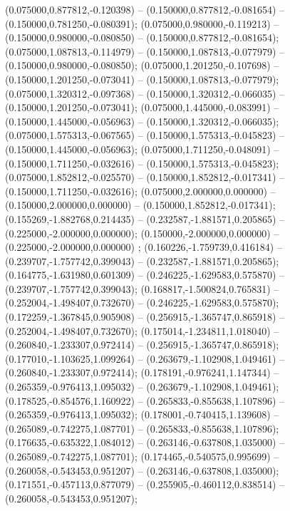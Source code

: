  (0.075000,0.877812,-0.120398) -- (0.150000,0.877812,-0.081654) -- (0.150000,0.781250,-0.080391);
 (0.075000,0.980000,-0.119213) -- (0.150000,0.980000,-0.080850) -- (0.150000,0.877812,-0.081654);
 (0.075000,1.087813,-0.114979) -- (0.150000,1.087813,-0.077979) -- (0.150000,0.980000,-0.080850);
 (0.075000,1.201250,-0.107698) -- (0.150000,1.201250,-0.073041) -- (0.150000,1.087813,-0.077979);
 (0.075000,1.320312,-0.097368) -- (0.150000,1.320312,-0.066035) -- (0.150000,1.201250,-0.073041);
 (0.075000,1.445000,-0.083991) -- (0.150000,1.445000,-0.056963) -- (0.150000,1.320312,-0.066035);
 (0.075000,1.575313,-0.067565) -- (0.150000,1.575313,-0.045823) -- (0.150000,1.445000,-0.056963);
 (0.075000,1.711250,-0.048091) -- (0.150000,1.711250,-0.032616) -- (0.150000,1.575313,-0.045823);
 (0.075000,1.852812,-0.025570) -- (0.150000,1.852812,-0.017341) -- (0.150000,1.711250,-0.032616);
 (0.075000,2.000000,0.000000) -- (0.150000,2.000000,0.000000) -- (0.150000,1.852812,-0.017341);
 (0.155269,-1.882768,0.214435) -- (0.232587,-1.881571,0.205865) -- (0.225000,-2.000000,0.000000);
 (0.150000,-2.000000,0.000000) -- (0.225000,-2.000000,0.000000) ;
 (0.160226,-1.759739,0.416184) -- (0.239707,-1.757742,0.399043) -- (0.232587,-1.881571,0.205865);
 (0.164775,-1.631980,0.601309) -- (0.246225,-1.629583,0.575870) -- (0.239707,-1.757742,0.399043);
 (0.168817,-1.500824,0.765831) -- (0.252004,-1.498407,0.732670) -- (0.246225,-1.629583,0.575870);
 (0.172259,-1.367845,0.905908) -- (0.256915,-1.365747,0.865918) -- (0.252004,-1.498407,0.732670);
 (0.175014,-1.234811,1.018040) -- (0.260840,-1.233307,0.972414) -- (0.256915,-1.365747,0.865918);
 (0.177010,-1.103625,1.099264) -- (0.263679,-1.102908,1.049461) -- (0.260840,-1.233307,0.972414);
 (0.178191,-0.976241,1.147344) -- (0.265359,-0.976413,1.095032) -- (0.263679,-1.102908,1.049461);
 (0.178525,-0.854576,1.160922) -- (0.265833,-0.855638,1.107896) -- (0.265359,-0.976413,1.095032);
 (0.178001,-0.740415,1.139608) -- (0.265089,-0.742275,1.087701) -- (0.265833,-0.855638,1.107896);
 (0.176635,-0.635322,1.084012) -- (0.263146,-0.637808,1.035000) -- (0.265089,-0.742275,1.087701);
 (0.174465,-0.540575,0.995699) -- (0.260058,-0.543453,0.951207) -- (0.263146,-0.637808,1.035000);
 (0.171551,-0.457113,0.877079) -- (0.255905,-0.460112,0.838514) -- (0.260058,-0.543453,0.951207);
